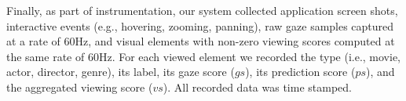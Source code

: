 Finally, as part of instrumentation, our system collected application screen shots, interactive events (e.g., hovering, zooming, panning), raw gaze samples captured at a rate of $60$Hz, and visual elements with non-zero viewing scores computed at the same rate of $60$Hz. For each viewed element we recorded the type (i.e., movie, actor, director, genre), its label, its gaze score ($gs$), its prediction score ($ps$), and the aggregated viewing score ($vs$). All recorded data was time stamped.
